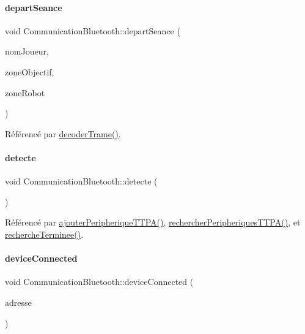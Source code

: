 \paragraph{\texorpdfstring{depart\+Seance}{departSeance}}
{\footnotesize\ttfamily void Communication\+Bluetooth\+::depart\+Seance (\begin{DoxyParamCaption}\item[{Q\+String}]{nom\+Joueur,  }\item[{Q\+String}]{zone\+Objectif,  }\item[{Q\+String}]{zone\+Robot }\end{DoxyParamCaption})\hspace{0.3cm}{\ttfamily [signal]}}



Référencé par \hyperlink{class_communication_bluetooth_a6b53f12131d9323cec8f2a03fe716e6a}{decoder\+Trame()}.

\mbox{\label{class_communication_bluetooth_a27ecb0427e1d2a6c936294e8a68e511f}} 
\paragraph{\texorpdfstring{detecte}{detecte}}
{\footnotesize\ttfamily void Communication\+Bluetooth\+::detecte (\begin{DoxyParamCaption}{ }\end{DoxyParamCaption})\hspace{0.3cm}{\ttfamily [signal]}}



Référencé par \hyperlink{class_communication_bluetooth_a53bc4772892ec57f030600e49fa0b6ff}{ajouter\+Peripherique\+T\+T\+P\+A()}, \hyperlink{class_communication_bluetooth_a4c2e2d557728c227faeb247cb8a9c482}{rechercher\+Peripheriques\+T\+T\+P\+A()}, et \hyperlink{class_communication_bluetooth_a79ee5a5bcaaf265048f1213b5504f146}{recherche\+Terminee()}.

\mbox{\label{class_communication_bluetooth_a046af482ca42ce0071aee1b2cf3a1a44}} 
\paragraph{\texorpdfstring{device\+Connected}{deviceConnected}}
{\footnotesize\ttfamily void Communication\+Bluetooth\+::device\+Connected (\begin{DoxyParamCaption}\item[{const Q\+Bluetooth\+Address \&}]{adresse }\end{DoxyParamCaption})\hspace{0.3cm}{\ttfamily [slot]}}




